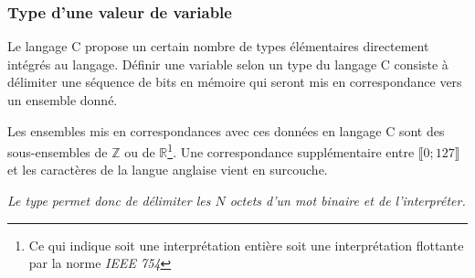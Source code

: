 \documentclass[../../../main.tex]{subfiles}
\begin{document}
\subsubsection{Type d'une valeur de variable}
Le langage C propose un certain nombre de types élémentaires directement intégrés au langage. Définir une variable selon un type du langage C consiste à délimiter une séquence de bits en mémoire qui seront mis en correspondance vers un ensemble donné.

Les ensembles mis en correspondances avec ces données en langage C sont des sous-ensembles de $\mathbb{Z}$ ou de $\mathbb{R}$\footnote{Ce qui indique soit une interprétation entière soit une interprétation flottante par la norme \textit{IEEE 754}}. Une correspondance supplémentaire entre $\llbracket 0; 127\rrbracket$ et les caractères de la langue anglaise vient en surcouche.

\textit{Le type permet donc de délimiter les $N$ octets d'un mot binaire et de l'interpréter.}
\end{document}
